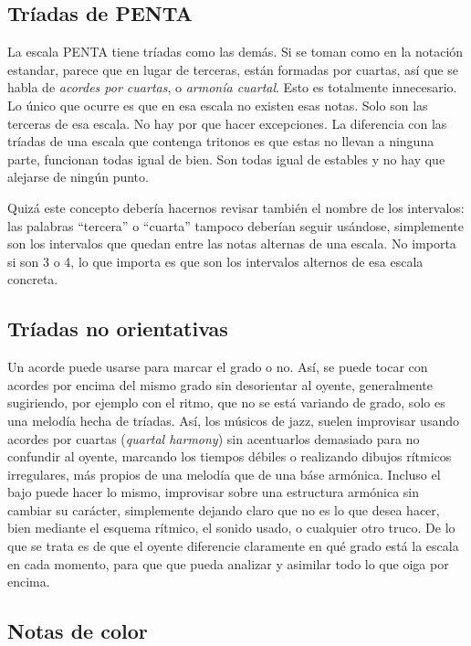 \documentclass[]{article}
\begin{document}
\subsection{Tríadas de \textsf{PENTA}}

La escala \textsf{PENTA} tiene tríadas como las demás. Si se toman como en la notación estandar, parece que en lugar de terceras, están formadas por cuartas, así que se habla de \emph{acordes por cuartas}, o \emph{armonía cuartal}. Esto es totalmente innecesario. Lo único que ocurre es que en esa escala no existen esas notas. Solo son las terceras de esa escala. No hay por que hacer excepciones. La diferencia con las tríadas de una escala que contenga tritonos es que estas no llevan a ninguna parte, funcionan todas igual de bien. Son todas igual de estables y no hay que alejarse de ningún punto. 

Quizá este concepto debería hacernos revisar también el nombre de los intervalos: las palabras ``tercera'' o ``cuarta'' tampoco deberían seguir usándose, simplemente son los intervalos que quedan entre las notas alternas de una escala. No importa si son 3 o 4, lo que importa es que son los intervalos alternos de esa escala concreta.

\subsection{Tríadas no orientativas}

Un acorde puede usarse para marcar el grado o no. Así, se puede tocar con acordes por encima del mismo grado sin desorientar al oyente, generalmente sugiriendo, por ejemplo con el ritmo, que no se está variando de grado, solo es una melodía hecha de tríadas. Así, los músicos de jazz, suelen improvisar usando acordes por cuartas (\emph{quartal harmony}) sin acentuarlos demasiado para no confundir al oyente, marcando los tiempos débiles o realizando dibujos rítmicos irregulares, más propios de una melodía que de una báse armónica. Incluso el bajo puede hacer lo mismo, improvisar sobre una estructura armónica sin cambiar su carácter, simplemente dejando claro que no es lo que desea hacer, bien mediante el esquema rítmico, el sonido usado, o cualquier otro truco. De lo que se trata es de que el oyente diferencie claramente en qué grado está la escala en cada momento, para que que pueda analizar y asimilar todo lo que oiga por encima.

\subsection{Notas de color}
\end{document}
